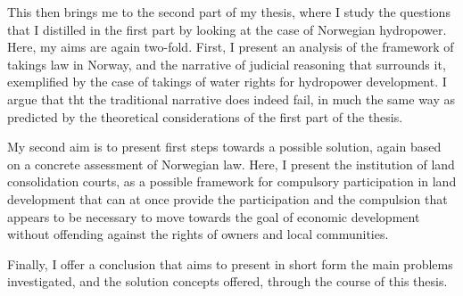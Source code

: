 This then brings me to the second part of my thesis, where I study the questions that I distilled in the first part by looking at the case of Norwegian hydropower. Here, my aims are again two-fold. First, I present an analysis of the framework of takings law in Norway, and the narrative of judicial reasoning that surrounds it, exemplified by the case of takings of water rights for hydropower development. I argue that tht the traditional narrative does indeed fail, in much the same way as predicted by the theoretical considerations of the first part of the thesis. 

My second aim is to present first steps towards a possible solution, again based on a concrete assessment of Norwegian law. Here, I present the institution of land consolidation courts, as a possible framework for compulsory participation in land development that can at once provide the participation and the compulsion that appears to be necessary to move towards the goal of economic development without offending against the rights of owners and local communities.

Finally, I offer a conclusion that aims to present in short form the main problems investigated, and the solution concepts offered, through the course of this thesis.


